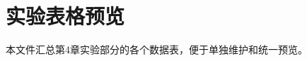 \documentclass[a4paper,12pt,fontset=fandol]{ctexart}
\begin{document}
\section*{实验表格预览}

本文件汇总第4章实验部分的各个数据表，便于单独维护和统一预览。







\end{document}
